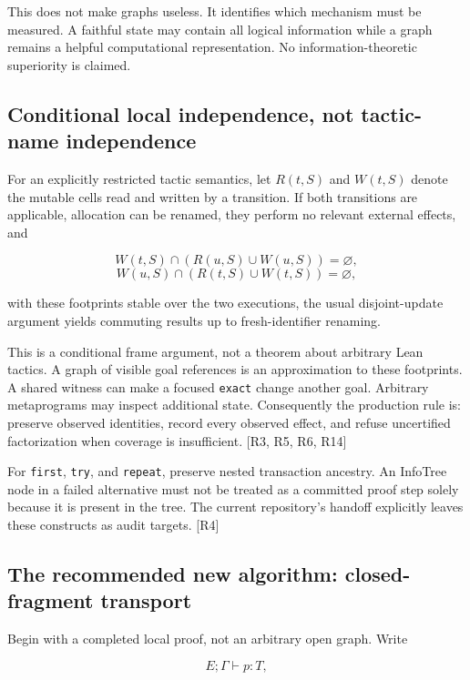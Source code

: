 \documentclass[
  10pt,
]{article}
\begin{document}
This does not make graphs useless. It identifies which mechanism must be
measured. A faithful state may contain all logical information while a
graph remains a helpful computational representation. No
information-theoretic superiority is claimed.

\subsection{Conditional local independence, not tactic-name
independence}\label{conditional-local-independence-not-tactic-name-independence}

For an explicitly restricted tactic semantics, let \(R(t,S)\) and
\(W(t,S)\) denote the mutable cells read and written by a transition. If
both transitions are applicable, allocation can be renamed, they perform
no relevant external effects, and

\[W(t,S)\cap(R(u,S)\cup W(u,S))=\varnothing,\]
\[W(u,S)\cap(R(t,S)\cup W(t,S))=\varnothing,\]

with these footprints stable over the two executions, the usual
disjoint-update argument yields commuting results up to fresh-identifier
renaming.

This is a conditional frame argument, not a theorem about arbitrary Lean
tactics. A graph of visible goal references is an approximation to these
footprints. A shared witness can make a focused \texttt{exact} change
another goal. Arbitrary metaprograms may inspect additional state.
Consequently the production rule is: preserve observed identities,
record every observed effect, and refuse uncertified factorization when
coverage is insufficient. {[}R3, R5, R6, R14{]}

For \texttt{first}, \texttt{try}, and \texttt{repeat}, preserve nested
transaction ancestry. An InfoTree node in a failed alternative must not
be treated as a committed proof step solely because it is present in the
tree. The current repository's handoff explicitly leaves these
constructs as audit targets. {[}R4{]}

\subsection{The recommended new algorithm: closed-fragment
transport}\label{the-recommended-new-algorithm-closed-fragment-transport}

Begin with a completed local proof, not an arbitrary open graph. Write

\[E;\Gamma\vdash p:T,\]
\end{document}
